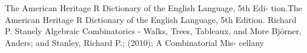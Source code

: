\documentclass[11pt,a4paper]{article}
\begin{document}
\newpage
\begin{thebibliography}{4}
	The American Heritage R Dictionary of the English Language, 5th Edi-
	tion.The American Heritage R Dictionary of the English Language, 5th
	Edition.
	Richard P. Stanely Algebraic Combinatorics - Walks, Trees, Tableaux,
	and More
	Björner, Anders; and Stanley, Richard P.; (2010); A Combinatorial Mis-
	cellany
\end{thebibliography}
\newpage

	
\end{document}
